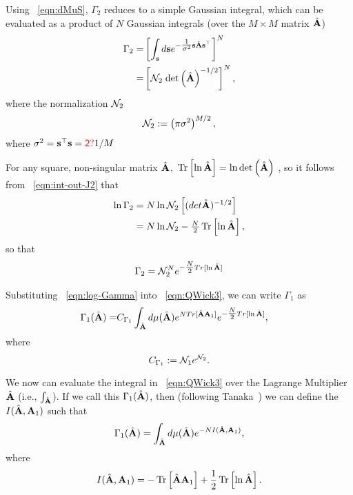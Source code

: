 Using \EQN~\ref{eqn:dMuS}, 
$\Gamma_2$ reduces to a simple Gaussian integral, which can be evaluated as a product of $N$ Gaussian integrals (over the $M\times M$ matrix $\hat{\mathbf{A}}$)
\begin{align}
\label{eqn:int-out-J2}
\Gamma_2 
   =& \left[\int_{{\mathbf{s}}} d\mathbf{s}e^{-\tfrac{1}{\sigma^{2}} \mathbf{s}\hat{\mathbf{A}}\mathbf{s}^{\top} }\right]^{N} \\
   =& \left[\mathcal{N}_{2}\;\mbox{}{\text{det}}\left(\hat{\mathbf{A}}\right)^{-1/2}\right]^{N}  ,
\end{align}
where the normalization $\mathcal{N}_2$
\begin{align}
\label{eqn:norm_2}
\mathcal{N}_2 := \left(\pi\sigma^{2}\right)^{M/2}  ,
\end{align}
where $\sigma^{2}=\mathbf{s}^{\top}\mathbf{s}={\color{red}\sf{2?}}1/M$

For any square, non-singular matrix $\hat{\mathbf{A}}$,  $ \mbox{}\operatorname{Tr}\left[\ln\hat{\mathbf{A}}\right]=\ln \mbox{}{\text{det}}\left(\hat{\mathbf{A}}\right)$ , so
it follows from \EQN~\ref{eqn:int-out-J2} that
\begin{align}
\nonumber
\ln\Gamma_2 
   &=N\ln\NORM_2\left[( det \AHAT)^{-1/2} \right]  \\  \nonumber %
&= N\ln\NORM_2 -\tfrac{N}{2}\Trace{ \ln\AHAT }  ,
\end{align}
so that
\begin{align}
\label{eqn:log-Gamma}
\Gamma_2 = \mathcal{N}_{2}^{N} e^{ -\tfrac{N}{2} Tr[ \ln\hat{\mathbf{A}} ] } 
\end{align}

Substituting
\EQN~\ref{eqn:log-Gamma}
into \EQN~\ref{eqn:QWick3},
we can write $\Gamma_1$ as
\begin{eqnarray}
  \label{eqn:gamma1}
\Gamma_1(\hat{\mathbf{A}})  =& C_{\Gamma_1}\int_{\hat{\mathbf{A}}} d\mu(\hat{\mathbf{A}})   e^{ N Tr[ \hat{\mathbf{A}}\mathbf{A}_{1} ] }  e^{ -\tfrac{N}{2} Tr[ \ln\hat{\mathbf{A}} ] }  ,
\end{eqnarray}
where
\begin{equation}
    C_{\Gamma_1}:=\mathcal{N}_1 e^{\mathcal{N}_2}  .
\end{equation}

We now can evaluate the integral in \EQN~\ref{eqn:QWick3} over the Lagrange Multiplier $\hat{\mathbf{A}}$ (i.e., $\int_{\hat{\mathbf{A}}} $). 
If we call this $\Gamma_1(\hat{\mathbf{A}})$,
then (following Tanaka~\cite{Tanaka2008}) we can define the \emph{\RateFunction} $I(\hat{\mathbf{A}},\mathbf{A}_{1})$ such that
\begin{align}
\label{eqn:LambdaA}
\Gamma_1(\hat{\mathbf{A}})=\int_{\hat{\mathbf{A}}}  d\mu(\hat{\mathbf{A}}) e^{-NI(\hat{\mathbf{A}},\mathbf{A}_{1})}  ,
\end{align}
where
\begin{align}
\label{eqn:IAA}
I(\hat{\mathbf{A}},\mathbf{A}_{1}) = -\mbox{}\operatorname{Tr}\left[ \hat{\mathbf{A}}\mathbf{A}_{1}\right] + \frac{1}{2}\mbox{}\operatorname{Tr}\left[ \ln\hat{\mathbf{A}} \right]  .
\end{align}


